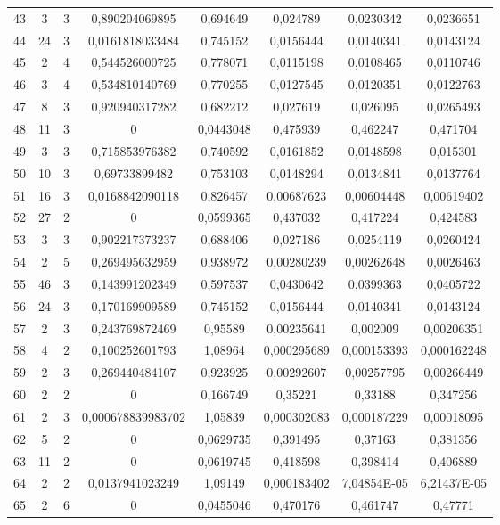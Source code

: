 \begin{longtable}{|c|c|c|c|c|c|c|c|}
43 & 3 & 3 & 0,890204069895 & 0,694649 & 0,024789 & 0,0230342 & 0,0236651  \\
44 & 24 & 3 & 0,0161818033484 & 0,745152 & 0,0156444 & 0,0140341 & 0,0143124  \\
45 & 2 & 4 & 0,544526000725 & 0,778071 & 0,0115198 & 0,0108465 & 0,0110746  \\
46 & 3 & 4 & 0,534810140769 & 0,770255 & 0,0127545 & 0,0120351 & 0,0122763  \\
47 & 8 & 3 & 0,920940317282 & 0,682212 & 0,027619 & 0,026095 & 0,0265493  \\
48 & 11 & 3 & 0 & 0,0443048 & 0,475939 & 0,462247 & 0,471704  \\
49 & 3 & 3 & 0,715853976382 & 0,740592 & 0,0161852 & 0,0148598 & 0,015301  \\
50 & 10 & 3 & 0,69733899482 & 0,753103 & 0,0148294 & 0,0134841 & 0,0137764  \\
51 & 16 & 3 & 0,0168842090118 & 0,826457 & 0,00687623 & 0,00604448 & 0,00619402  \\
52 & 27 & 2 & 0 & 0,0599365 & 0,437032 & 0,417224 & 0,424583  \\
53 & 3 & 3 & 0,902217373237 & 0,688406 & 0,027186 & 0,0254119 & 0,0260424  \\
54 & 2 & 5 & 0,269495632959 & 0,938972 & 0,00280239 & 0,00262648 & 0,0026463  \\
55 & 46 & 3 & 0,143991202349 & 0,597537 & 0,0430642 & 0,0399363 & 0,0405722  \\
56 & 24 & 3 & 0,170169909589 & 0,745152 & 0,0156444 & 0,0140341 & 0,0143124  \\
57 & 2 & 3 & 0,243769872469 & 0,95589 & 0,00235641 & 0,002009 & 0,00206351  \\
58 & 4 & 2 & 0,100252601793 & 1,08964 & 0,000295689 & 0,000153393 & 0,000162248  \\
59 & 2 & 3 & 0,269440484107 & 0,923925 & 0,00292607 & 0,00257795 & 0,00266449  \\
60 & 2 & 2 & 0 & 0,166749 & 0,35221 & 0,33188 & 0,347256  \\
61 & 2 & 3 & 0,000678839983702 & 1,05839 & 0,000302083 & 0,000187229 & 0,00018095  \\
62 & 5 & 2 & 0 & 0,0629735 & 0,391495 & 0,37163 & 0,381356  \\
63 & 11 & 2 & 0 & 0,0619745 & 0,418598 & 0,398414 & 0,406889  \\
64 & 2 & 2 & 0,0137941023249 & 1,09149 & 0,000183402 & 7,04854E-05 & 6,21437E-05  \\
65 & 2 & 6 & 0 & 0,0455046 & 0,470176 & 0,461747 & 0,47771  \\

\end{longtable}

